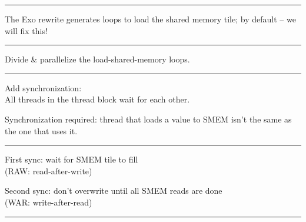 \newpage
{}

{\large

}

\vspace{3mm}
\hrule

{\LARGE
The Exo rewrite generates loops to load the shared memory tile;
 by default -- we will fix this!

}

\newpage
{}

{\large

}

\vspace{3mm}
\hrule

{\LARGE
Divide \& parallelize the load-shared-memory loops.
}

\newpage
{}

{\large

}

\vspace{3mm}
\hrule

{\LARGE
Add synchronization:\\
All threads in the thread block wait for each other.

}

\newpage
{}

{\LARGE
Synchronization required: thread that loads a value to SMEM isn't the same as the one that uses it.

}

\vfill
\hrule
\vfill

\begin{center}
\Large
\begin{tikzpicture}[node distance=0mm]


\end{tikzpicture}
\end{center}

\newpage
{}

{\LARGE
First sync: wait for SMEM tile to fill\\(RAW: read-after-write)

Second sync: don't overwrite until all SMEM reads are done\\(WAR: write-after-read)

}

\vfill
\hrule
\vfill

